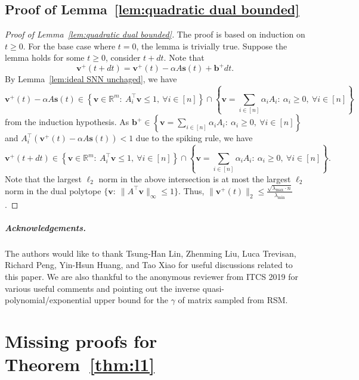 \documentclass[11pt]{article}
\theoremstyle{remark}
\theoremstyle{definition}
\newcommand{\bb}{\mathbf{b}}
\newcommand{\bv}{\mathbf{v}}
\newcommand{\bs}{\mathbf{s}}
\newcommand{\R}{{\mathbb R}} %
\begin{document}
\subsection{Proof of Lemma~\ref{lem:quadratic dual bounded}}
\begin{proof}[Proof of Lemma~\ref{lem:quadratic dual bounded}]
	The proof is based on induction on $t\geq0$. For the base case where $t=0$, the lemma is trivially true. Suppose the lemma holds for some $t\geq0$, consider $t+dt$. Note that
	$$
	\bv^+(t+dt) = \bv^+(t) - \alpha A\bs(t) + \bb^+dt.
	$$
	By Lemma~\ref{lem:ideal SNN unchaged}, we have
	$$
	\bv^+(t) - \alpha A\bs(t)\in\left\{\bv\in\R^m:\ A_i^\top\bv\leq1,\ \forall i\in[n]\right\}\cap\left\{\bv=\sum_{i\in[n]}\alpha_iA_i:\ \alpha_i\geq0,\ \forall i\in[n] \right\}
	$$
	from the induction hypothesis. As $\bb^+\in\left\{\bv=\sum_{i\in[n]}\alpha_iA_i:\ \alpha_i\geq0,\ \forall i\in[n] \right\}$ and $A_i^\top\left(\bv^+(t) - \alpha A\bs(t)\right)<1$ due to the spiking rule, we have
	$$
	\bv^+(t+dt)\in\left\{\bv\in\R^m:\ A_i^\top\bv\leq1,\ \forall i\in[n]\right\}\cap\left\{\bv=\sum_{i\in[n]}\alpha_iA_i:\ \alpha_i\geq0,\ \forall i\in[n] \right\}.
	$$
	Note that the largest $\ell_2$ norm in the above intersection is at most the largest $\ell_2$ norm in the dual polytope $\{\bv:\ \|A^\top\bv\|_\infty\leq1\}$. Thus, $\|\bv^+(t)\|_2\leq\frac{\sqrt{\lambda_{\max}\cdot n}}{\lambda_{\min}}$.
\end{proof}


\subparagraph*{Acknowledgements.}
The authors would like to thank Tsung-Han Lin, Zhenming Liu, Luca  Trevisan, Richard Peng, Yin-Hsun Huang, and Tao Xiao for useful discussions related to this paper. We are also thankful to the anonymous reviewer from ITCS 2019 for various useful comments and pointing out the inverse quasi-polynomial/exponential upper bound for the $\gamma$ of matrix sampled from RSM.





\appendix
\section{Missing proofs for Theorem~\ref{thm:l1}}\label{sec:missing proofs}
\end{document}
